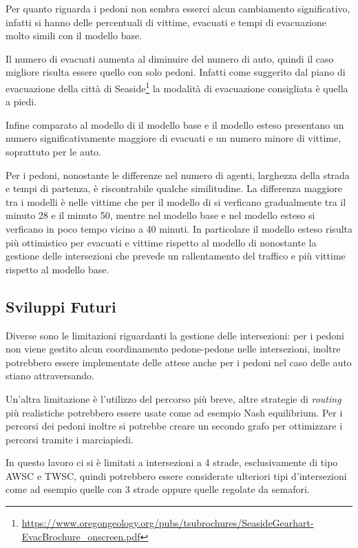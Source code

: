 Per quanto riguarda i pedoni non sembra esserci alcun cambiamento significativo,
infatti si hanno delle percentuali di vittime, evacuati e tempi di evacuazione molto simili con il modello base.

Il numero di evacuati aumenta al diminuire del numero di auto, quindi il caso migliore risulta essere quello con solo pedoni.
Infatti come suggerito dal piano di evacuazione della città di Seaside\footnote{\url{https://www.oregongeology.org/pubs/tsubrochures/SeasideGearhart-EvacBrochure_onscreen.pdf}}
la modalità di evacuazione consigliata è quella a piedi.

Infine comparato al modello di \textcite{wang2021novel} il modello base e il modello esteso presentano un numero significativamente maggiore di evacuati e un numero minore di vittime, soprattuto per le auto.

Per i pedoni, nonostante le differenze nel numero di agenti, larghezza della strada e tempi di partenza, è riscontrabile qualche similitudine. 
La differenza maggiore tra i modelli è nelle vittime che per il modello di \textcite{wang2021novel} si verficano gradualmente tra il minuto 28 e il minuto 50, mentre nel modello
base e nel modello esteso si verficano in poco tempo vicino a 40 minuti.
In particolare il modello esteso risulta più ottimistico per evacuati e vittime rispetto al modello di \textcite{wang2021novel} nonostante la gestione delle intersezioni 
che prevede un rallentamento del traffico e più vittime rispetto al modello base.

\subsection{Sviluppi Futuri}
Diverse sono le limitazioni riguardanti la gestione delle intersezioni: per i pedoni non viene gestito alcun coordinamento pedone-pedone nelle intersezioni, inoltre
potrebbero essere implementate delle attese anche per i pedoni nel caso delle auto stiano attraversando.

Un'altra limitazione è l'utilizzo del percorso più breve, altre strategie di \textit{routing} più realistiche potrebbero essere usate come ad esempio Nash equilibrium.
Per i percorsi dei pedoni inoltre si potrebbe creare un secondo grafo per ottimizzare i percorsi tramite i marciapiedi.

In questo lavoro ci si è limitati a intersezioni a 4 strade, esclusivamente di tipo AWSC e TWSC, quindi potrebbero essere considerate
ulteriori tipi d'intersezioni come ad esempio quelle con 3 strade oppure quelle regolate da semafori.

